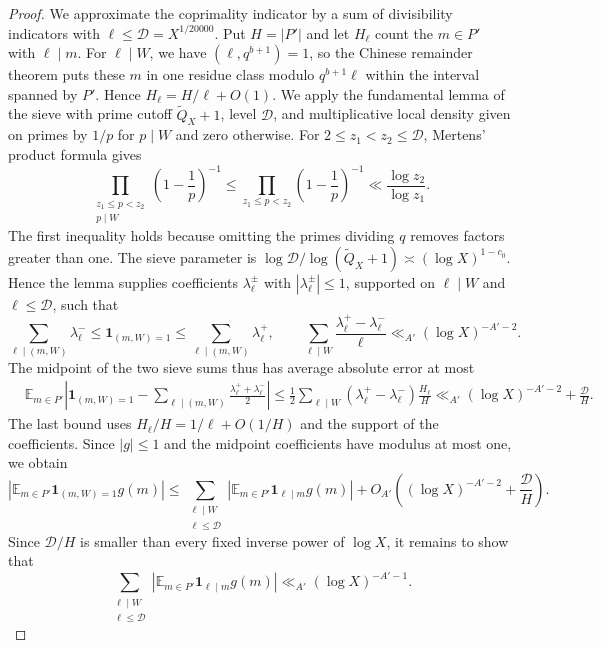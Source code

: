 \documentclass[12pt]{amsart}
\newcommand{\1}{\mathbf 1}
\theoremstyle{definition}
\begin{document}
\begin{proof}
We approximate the coprimality indicator by a sum of divisibility
indicators with $\ell\leq\mathcal D=X^{1/20000}$. Put $H=|P'|$
and let $H_\ell$ count the $m\in P'$ with $\ell\mid m$. For
$\ell\mid W$, we have $(\ell,q^{b+1})=1$, so the Chinese
remainder theorem puts these $m$ in one residue class modulo
$q^{b+1}\ell$ within the interval spanned by $P'$.  Hence $H_\ell=H/\ell+O(1)$. We apply the fundamental lemma of the sieve
\cite[Lemma~6.3]{IwaniecKowalski} with prime cutoff
$\widetilde Q_X+1$, level $\mathcal D$, and multiplicative local
density given on primes by $1/p$ for $p\mid W$ and zero otherwise.
For \(2\leq z_1<z_2\leq \mathcal D\), Mertens' product
formula gives
\[
 \prod_{\substack{z_1\leq p<z_2\\p\mid W}}
       \left(1-\frac1p\right)^{-1}
 \leq
 \prod_{z_1\leq p<z_2}\left(1-\frac1p\right)^{-1}
 \ll \frac{\log z_2}{\log z_1}.
\]
The first inequality holds because omitting the primes dividing
\(q\) removes factors greater than one.  The sieve parameter is
\(\log\mathcal D/\log(\widetilde Q_X+1)
\asymp(\log X)^{1-c_0}\). Hence the lemma supplies coefficients
\(\lambda_\ell^\pm\) with \(|\lambda_\ell^\pm|\leq1\), supported
on \(\ell\mid W\) and \(\ell\leq\mathcal D\), such that
\[
 \sum_{\ell\mid(m,W)}\lambda_\ell^-
 \leq\mathbf1_{(m,W)=1}
 \leq\sum_{\ell\mid(m,W)}\lambda_\ell^+,
 \qquad
 \sum_{\ell\mid W}\frac{\lambda_\ell^+-\lambda_\ell^-}{\ell}
 \ll_{A'}(\log X)^{-A'-2}.
\]
The midpoint of the two sieve sums thus has average absolute
error at most
\[
\begin{aligned}
 &\mathbb E_{m\in P'}
 \left|\mathbf1_{(m,W)=1}
       -\sum_{\ell\mid(m,W)}
         \frac{\lambda_\ell^++\lambda_\ell^-}{2}\right|\leq
 \frac12\sum_{\ell\mid W}
    (\lambda_\ell^+-\lambda_\ell^-)\frac{H_\ell}{H}
 \ll_{A'}(\log X)^{-A'-2}+\frac{\mathcal D}{H}.
\end{aligned}
\]
The last bound uses $H_\ell/H=1/\ell+O(1/H)$ and the support
of the coefficients. Since $|g|\leq1$ and the midpoint
coefficients have modulus at most one, we obtain
\[
 \left|\mathbb E_{m\in P'}\mathbf1_{(m,W)=1}g(m)\right|
 \leq
 \sum_{\substack{\ell\mid W\\\ell\leq\mathcal D}}
 \left|\mathbb E_{m\in P'}\mathbf1_{\ell\mid m}g(m)\right|
 +O_{A'}\!\left((\log X)^{-A'-2}+\frac{\mathcal D}{H}\right).
\]
Since $\mathcal D/H$ is smaller than every fixed inverse power
of $\log X$,  it remains to show that
\[
 \sum_{\substack{\ell\mid W\\\ell\leq\mathcal D}}
 \left|\mathbb E_{m\in P'}\mathbf1_{\ell\mid m}g(m)\right|
 \ll_{A'}(\log X)^{-A'-1}.
\]


\end{proof}
\end{document}
